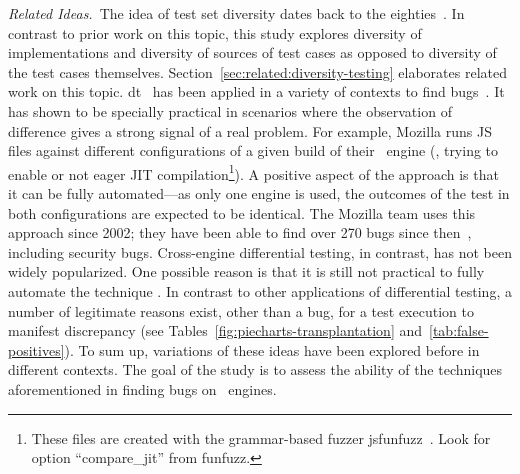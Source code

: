 \emph{Related Ideas.}~The idea of test set diversity dates back to the
eighties~\cite{white-cohen-tse1980,ostrand-balcer-1988}. In contrast
to prior work on this topic, this study explores diversity of
implementations and diversity of sources of test cases as opposed to
diversity of the test cases themselves. Section~\ref{sec:related:diversity-testing}
elaborates related work on this topic. \gls{dt}~\cite{Brumley-etal-ss07}
has been applied in a variety of contexts to find
bugs~\cite{Yang-etal-pldi11,Chen-etal-fse2015,Argyros-etla-ccs16,Chen-etal-pldi16,petsios-etal-sp2017,SivakornAPKJ17,Zhang:2017:ATD:3097368.3097448}.
It has shown to be specially practical in scenarios where the
observation of difference gives a strong signal of a real problem. For
example, Mozilla runs JS files against different configurations of a
given build of their \smonkey\ engine (\eg{}, trying to enable or not
eager JIT compilation\footnote{These files are created with the
  grammar-based fuzzer jsfunfuzz~\cite{jsfunfuzz}. Look for option
  ``compare\_jit'' from funfuzz.}). A positive aspect of the approach
is that it can be fully automated---as only one engine is used, the
outcomes of the test in both configurations are expected to be
identical. The Mozilla team uses this approach since 2002; they have
been able to find over 270 bugs since
then~\cite{jsfunfuzz-at-mozilla}, including security
bugs. Cross-engine differential testing, in contrast, has not been
widely popularized. One possible reason is that it is still not
practical to fully automate the technique . In contrast to other
applications of differential testing, a number of legitimate reasons
exist, other than a bug, for a test execution to manifest discrepancy
(see Tables~\ref{fig:piecharts-transplantation} and~\ref{tab:false-positives}).
To sum up, variations of these ideas have
been explored before in different contexts.  The goal of the study is
to assess the ability of the techniques aforementioned in finding bugs
on \javascript\ engines.



